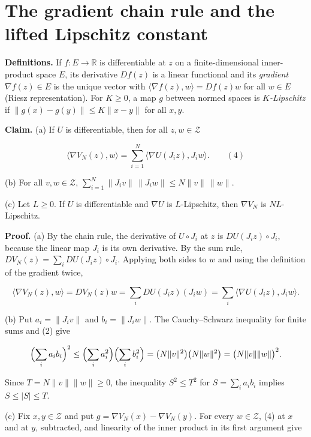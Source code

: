 \documentclass[11pt,a4paper]{article}
\begin{document}
\section{\texorpdfstring{The gradient chain rule and the lifted Lipschitz constant}{The gradient chain rule and the lifted Lipschitz constant}}


\textbf{Definitions.} If \(f:E\to\mathbb R\) is differentiable at \(z\) on a finite-dimensional inner-product space \(E\), its derivative \(Df(z)\) is a linear functional and its \emph{gradient} \(\nabla f(z)\in E\) is the unique vector with \(\langle\nabla f(z),w\rangle=Df(z)w\) for all \(w\in E\) (Riesz representation). For \(K\ge0\), a map \(g\) between normed spaces is \emph{\(K\)-Lipschitz} if \(\|g(x)-g(y)\|\le K\|x-y\|\) for all \(x,y\).




\textbf{Claim.} (a) If \(U\) is differentiable, then for all \(z,w\in\mathcal Z\)


\[\langle\nabla V_N(z),w\rangle=\sum_{i=1}^N\langle\nabla U(J_iz),J_iw\rangle .\qquad(4)\]


(b) For all \(v,w\in\mathcal Z\), \(\sum_{i=1}^N\|J_iv\|\,\|J_iw\|\le N\|v\|\,\|w\|\).




(c) Let \(L\ge0\). If \(U\) is differentiable and \(\nabla U\) is \(L\)-Lipschitz, then \(\nabla V_N\) is \(NL\)-Lipschitz.




\textbf{Proof.} (a) By the chain rule, the derivative of \(U\circ J_i\) at \(z\) is \(DU(J_iz)\circ J_i\), because the linear map \(J_i\) is its own derivative. By the sum rule, \(DV_N(z)=\sum_iDU(J_iz)\circ J_i\). Applying both sides to \(w\) and using the definition of the gradient twice,


\[\langle\nabla V_N(z),w\rangle=DV_N(z)w=\sum_iDU(J_iz)(J_iw)=\sum_i\langle\nabla U(J_iz),J_iw\rangle .\]


(b) Put \(a_i=\|J_iv\|\) and \(b_i=\|J_iw\|\). The Cauchy–Schwarz inequality for finite sums and (2) give


\[\Bigl(\sum_ia_ib_i\Bigr)^2\le\Bigl(\sum_ia_i^2\Bigr)\Bigl(\sum_ib_i^2\Bigr)=\bigl(N\|v\|^2\bigr)\bigl(N\|w\|^2\bigr)=\bigl(N\|v\|\|w\|\bigr)^2 .\]


Since \(T=N\|v\|\|w\|\ge0\), the inequality \(S^2\le T^2\) for \(S=\sum_ia_ib_i\) implies \(S\le|S|\le T\).




(c) Fix \(x,y\in\mathcal Z\) and put \(g=\nabla V_N(x)-\nabla V_N(y)\). For every \(w\in\mathcal Z\), (4) at \(x\) and at \(y\), subtracted, and linearity of the inner product in its first argument give
\end{document}
